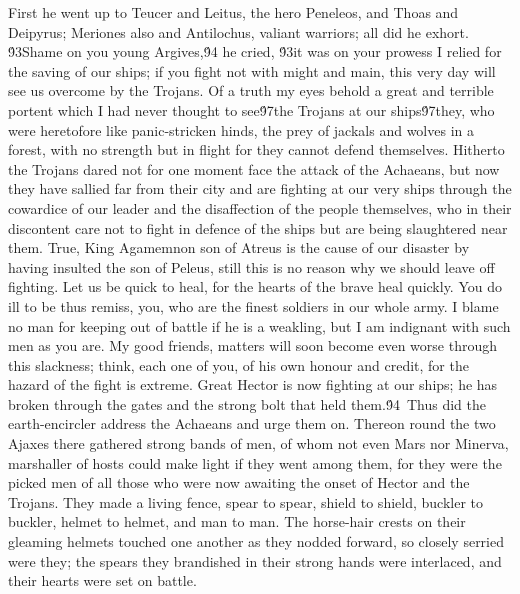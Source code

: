{First he went up to Teucer and Leitus, the hero Peneleos, and Thoas and Deipyrus; Meriones also and Antilochus, valiant warriors; all did he exhort. \'93Shame on you young Argives,\'94 he cried, \'93it was on your prowess I relied for the saving of our ships; if you fight not with might and main, this very day will see us overcome by the Trojans. Of a truth my eyes behold a great and terrible portent which I had never thought to see\'97the Trojans at our ships\'97they, who were heretofore like panic-stricken hinds, the prey of jackals and wolves in a forest, with no strength but in flight for they cannot defend themselves. Hitherto the Trojans dared not for one moment face the attack of the Achaeans, but now they have sallied far from their city and are fighting at our very ships through the cowardice of our leader and the disaffection of the people themselves, who in their discontent care not to fight in defence of the ships but are being slaughtered near them. True, King Agamemnon son of Atreus is the cause of our disaster by having insulted the son of Peleus, still this is no reason why we should leave off fighting. Let us be quick to heal, for the hearts of the brave heal quickly. You do ill to be thus remiss, you, who are the finest soldiers in our whole army. I blame no man for keeping out of battle if he is a weakling, but I am indignant with such men as you are. My good friends, matters will soon become even worse through this slackness; think, each one of you, of his own honour and credit, for the hazard of the fight is extreme. Great Hector is now fighting at our ships; he has broken through the gates and the strong bolt that held them.\'94\
Thus did the earth-encircler address the Achaeans and urge them on. Thereon round the two Ajaxes there gathered strong bands of men, of whom not even Mars nor Minerva, marshaller of hosts could make light if they went among them, for they were the picked men of all those who were now awaiting the onset of Hector and the Trojans. They made a living fence, spear to spear, shield to shield, buckler to buckler, helmet to helmet, and man to man. The horse-hair crests on their gleaming helmets touched one another as they nodded forward, so closely serried were they; the spears they brandished in their strong hands were interlaced, and their hearts were set on battle.\
}
